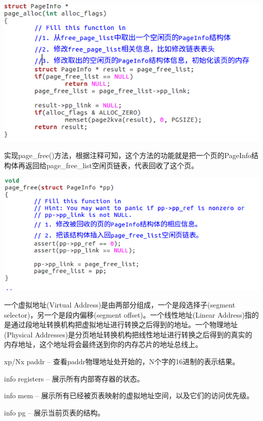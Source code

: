 \begin{ExerciseList}
  \includegraphics[width=6in]{figures/lab2/image43.png}

  实现page\_free()方法，根据注释可知，这个方法的功能就是把一个页的PageInfo结构体再返回给page\_free\_list空闲页链表，代表回收了这个页。

  \includegraphics[width=6in]{figures/lab2/image44.png}

  一个虚拟地址(Virtual Address)是由两部分组成，一个是段选择子(segment selector)，另一个是段内偏移(segment offset)。一个线性地址(Linear Address)指的是通过段地址转换机构把虚拟地址进行转换之后得到的地址。一个物理地址(Physical Addresses)是分页地址转换机构把线性地址进行转换之后得到的真实的内存地址，这个地址将会最终送到你的内存芯片的地址总线上。

  xp/Nx paddr – 查看paddr物理地址处开始的，N个字的16进制的表示结果。

  info registers – 展示所有内部寄存器的状态。

  info mem – 展示所有已经被页表映射的虚拟地址空间，以及它们的访问优先级。

  info pg – 展示当前页表的结构。



\end{ExerciseList}
